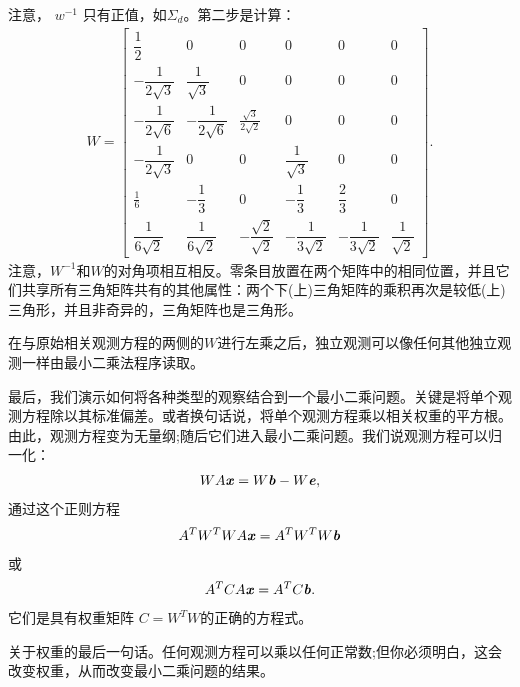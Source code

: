 注意， $w^{-1}$ 只有正值，如$ \Sigma_{d}$。第二步是计算：
\begin{align*}
W = 
\begin{bmatrix}
\dfrac{1}{2} & 0 & 0 & 0 & 0 & 0 \\
-\dfrac{1}{2\sqrt{3}} & \dfrac{1}{\sqrt{3}} & 0 & 0 & 0 & 0 \\
-\dfrac{1}{2\sqrt{6}} & -\dfrac{1}{2\sqrt{6}} & \frac{\sqrt{3}}{2\sqrt{2}} & 0 & 0 & 0 \\
-\dfrac{1}{2\sqrt{3}} & 0 & 0 & \dfrac{1}{\sqrt{3}} & 0 & 0 \\
\frac{1}{6} & -\dfrac{1}{3} & 0 & -\dfrac{1}{3} & \dfrac{2}{3} & 0 \\
\dfrac{1}{6\sqrt{2}} & \dfrac{1}{6\sqrt{2}} & -\dfrac{\sqrt{2}}{\sqrt{2}} & -\dfrac{1}{3\sqrt{2}} & -\dfrac{1}{3\sqrt{2}} & \dfrac{1}{\sqrt{2}} 
\end{bmatrix}.
\end{align*}
注意，$W^{-1}$和$W $的对角项相互相反。零条目放置在两个矩阵中的相同位置，并且它们共享所有三角矩阵共有的其他属性：两个下(上)三角矩阵的乘积再次是较低(上)三角形，并且非奇异的，三角矩阵也是三角形。

在与原始相关观测方程的两侧的$W$进行左乘之后，独立观测可以像任何其他独立观测一样由最小二乘法程序读取。

最后，我们演示如何将各种类型的观察结合到一个最小二乘问题。关键是将单个观测方程除以其标准偏差。或者换句话说，将单个观测方程乘以相关权重的平方根。由此，观测方程变为无量纲;随后它们进入最小二乘问题。我们说观测方程可以归一化：
\begin{align}
WA\textbf{\textit{x}} = W\textbf{\textit{b}}-W\textbf{\textit{e}},
\end{align}
通过这个正则方程
\begin{align}
A^{T}W^{T}WA\textbf{\textit{x}}=A^{T}W^{T}W\textbf{\textit{b}}
\end{align}
或
\begin{align}
A^{T}CA\textbf{\textit{x}}=A^{T}C\textbf{\textit{b}}.
\end{align}
它们是具有权重矩阵 $ C=W^{T}W$的正确的方程式。

关于权重的最后一句话。任何观测方程可以乘以任何正常数;但你必须明白，这会改变权重，从而改变最小二乘问题的结果。